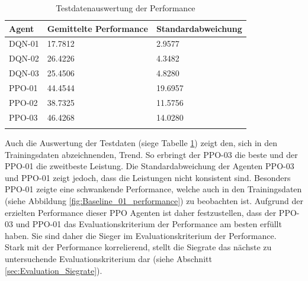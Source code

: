 \begin{longtable}[h]{|p{2.7cm}|p{4.5cm}|p{4cm}|}
	\hline
	Agent & Gemittelte Performance & Standardabweichung \\
	\hline
	DQN-01 & 17.7812 & 2.9577 \\
	\hline
	DQN-02 & 26.4226 & 4.3482 \\
	\hline
	DQN-03 & 25.4506 & 4.8280 \\
	\hline
	PPO-01 & 44.4544 & 19.6957 \\
	\hline
	PPO-02 & 38.7325 & 11.5756 \\
	\hline
	PPO-03 & 46.4268 & 14.0280 \\
	\hline
\caption{Testdatenauswertung der Performance}
\label{tab:Evaluation_Testdaten_Performance} 
\end{longtable}
Auch die Auswertung der Testdaten (siege Tabelle \ref{tab:Evaluation_Testdaten_Performance}) zeigt den, sich in den Trainingsdaten abzeichnenden, Trend. So erbringt der PPO-03 die beste und der PPO-01 die zweitbeste Leistung. Die Standardabweichung der Agenten PPO-03 und PPO-01 zeigt jedoch, dass die Leistungen nicht konsistent sind. Besonders PPO-01 zeigte eine schwankende Performance, welche auch in den Trainingsdaten (siehe Abbildung \ref{fig:Baseline_01_performance}) zu beobachten ist.
Aufgrund der erzielten Performance dieser PPO Agenten ist daher festzustellen, dass der PPO-03 und PPO-01 das Evaluationskriterium der Performance am besten erfüllt haben. Sie sind daher die Sieger im Evaluationskriterium der Performance.\\
Stark mit der Performance korrelierend, stellt die Siegrate das nächste zu untersuchende Evaluationskriterium dar (siehe Abschnitt \ref{sec:Evaluation_Siegrate}).

